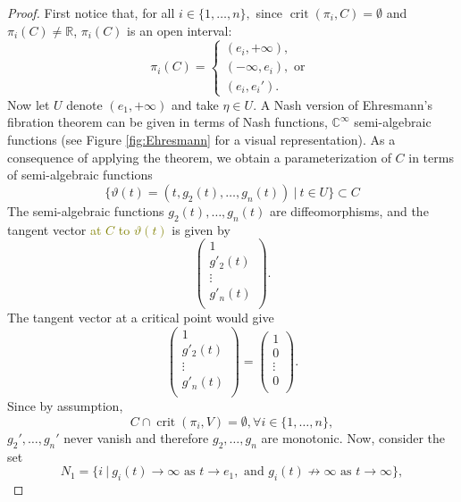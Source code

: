 \documentclass[11pt]{article}
\theoremstyle{definition}
\newcommand{\C}{\mathbb{C}}
\newcommand{\R}{\mathbb{R}}
\DeclareMathOperator{\crit}{crit}
\def\ms#1{\textcolor{olive}{#1}}
\begin{document}
\begin{proof}
First notice that, for all $i \in \{1,\hdots,n\},$ since $\crit(\pi_i,C) = \emptyset$ and $\pi_i(C) \not = \R$, $\pi_i(C)$ is an open interval:
\[
\pi_i(C)=
\begin{cases}
			(e_i,+\infty), \\
                (-\infty,e_i),\textrm{ or }\\
                (e_i,e_i').
\end{cases}
\]
Now let $U$ denote $(e_1,+\infty)$ and take $\eta \in U.$ A Nash version of
Ehresmann's fibration theorem \cite[Th. 2.4 and 3.1]{Shiota1992} can be given in
terms of Nash functions, $\C^{\infty}$ semi-algebraic functions (see Figure \ref{fig:Ehresmann} for a visual representation). As a consequence of applying the theorem, we obtain a parameterization of $C$ in terms of semi-algebraic functions
\[
\big\{\vartheta(t) = (t,g_2(t),\hdots,g_n(t))~|~ t \in U\big\} \subset C
\]
The semi-algebraic functions $g_2(t),\hdots,g_n(t)$ are diffeomorphisms, and the
tangent vector \ms{at $C$ to $\vartheta(t)$} is given by 
\[
\begin{pmatrix}
    1 \\
    g'_2(t)\\
    \vdots\\
    g'_n(t)\\
\end{pmatrix}.
\]
The tangent vector at a critical point would give
\[
\begin{pmatrix}
    1 \\
    g'_2(t)\\
    \vdots\\
    g'_n(t)\\
\end{pmatrix}
=
\begin{pmatrix}
    1 \\
    0\\
    \vdots\\
    0\\
\end{pmatrix}.
\]
Since by assumption, 
\[
C \cap \crit(\pi_i,V) = \emptyset, \forall i \in \{1,\hdots,n\},
\]
$g_2',\hdots,g_n'$ never vanish and therefore $g_2,\hdots,g_n$ are monotonic. Now, consider the set 
\[
N_1 = \big\{i~|~g_i(t) \rightarrow \infty \textrm{ as } t \rightarrow e_1, \textrm{ and } g_i(t) \not \rightarrow \infty \textrm{ as } t \rightarrow \infty\big\},
\]
\end{proof}
\end{document}
